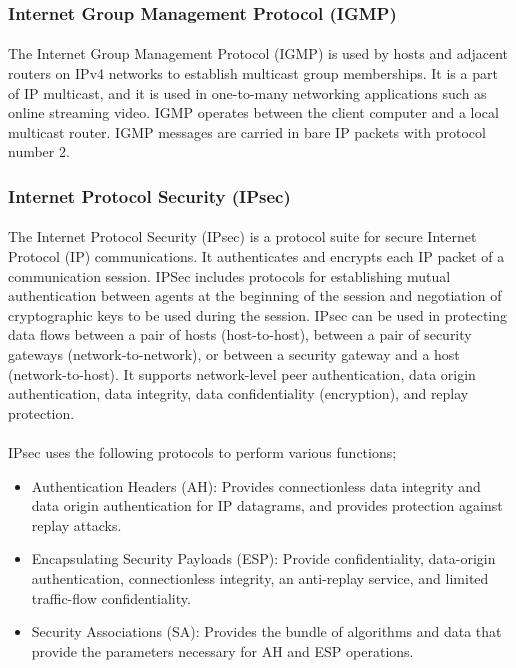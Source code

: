 \subsubsection*{Internet Group Management Protocol (IGMP)\cite{IGMP}}
\paragraph{}The Internet Group Management Protocol (IGMP) is used by hosts and adjacent routers on IPv4 networks to establish multicast group memberships. It is a part of IP multicast, and it is used in one-to-many networking applications such as online streaming video. IGMP operates between the client computer and a local multicast router. IGMP messages are carried in bare IP packets with protocol number 2.

\subsubsection*{Internet Protocol Security (IPsec)\cite{IPsec}}
\paragraph{}The Internet Protocol Security (IPsec) is a protocol suite for secure Internet Protocol (IP) communications. It authenticates and encrypts each IP packet of a communication session. IPSec includes protocols for establishing mutual authentication between agents at the beginning of the session and negotiation of cryptographic keys to be used during the session. IPsec can be used in protecting data flows between a pair of hosts (host-to-host), between a pair of security gateways (network-to-network), or between a security gateway and a host (network-to-host). It supports network-level peer authentication, data origin authentication, data integrity, data confidentiality (encryption), and replay protection.
\paragraph{}IPsec uses the following protocols to perform various functions;
\begin{itemize}
\item Authentication Headers (AH): Provides connectionless data integrity and data origin authentication for IP datagrams, and provides protection against replay attacks.
\item Encapsulating Security Payloads (ESP): Provide confidentiality, data-origin authentication, connectionless integrity, an anti-replay service, and limited traffic-flow confidentiality.
\item Security Associations (SA): Provides the bundle of algorithms and data that provide the parameters necessary for AH and ESP operations.
\end{itemize}

